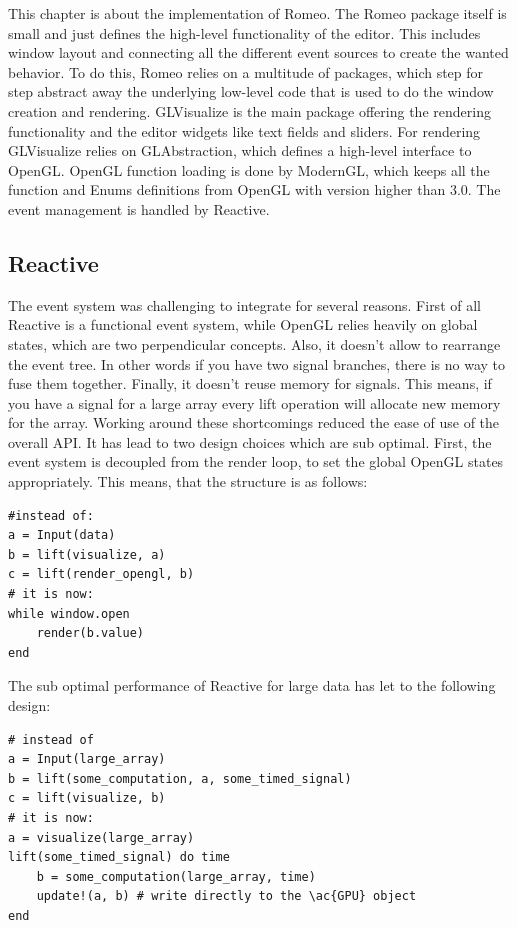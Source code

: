 This chapter is about the implementation of Romeo.
The Romeo package itself is small and just defines the high-level functionality of the editor.
This includes window layout and connecting all the different event sources to create the wanted behavior.
To do this, Romeo relies on a multitude of packages, which step for step abstract away the underlying low-level code that is used to do the window creation and rendering.
GLVisualize is the main package offering the rendering functionality and the editor widgets like text fields and sliders.
For rendering GLVisualize relies on GLAbstraction, which defines a high-level interface to \ac{OpenGL}.
\ac{OpenGL} function loading is done by ModernGL, which keeps all the function and Enums definitions from \ac{OpenGL} with version higher than 3.0.
The event management is handled by Reactive.

\subsection{Reactive}

The event system was challenging to integrate for several reasons.
First of all Reactive is a functional event system, while \ac{OpenGL} relies heavily on global states, which are two perpendicular concepts.
Also, it doesn't allow to rearrange the event tree. In other words if you have two signal branches, there is no way to fuse them together.
Finally, it doesn't reuse memory for signals. This means, if you have a signal for a large array every lift operation will allocate new memory for the array.
Working around these shortcomings reduced the ease of use of the overall API.
It has lead to two design choices which are sub optimal.
First, the event system is decoupled from the render loop, to set the global \ac{OpenGL} states appropriately.
This means, that the structure is as follows:
\begin{lstlisting}
#instead of:
a = Input(data)
b = lift(visualize, a)
c = lift(render_opengl, b)
# it is now:
while window.open
	render(b.value)
end
\end{lstlisting}
The sub optimal performance of Reactive for large data has let to the following design:
\begin{lstlisting}
# instead of
a = Input(large_array)
b = lift(some_computation, a, some_timed_signal)
c = lift(visualize, b)
# it is now:
a = visualize(large_array)
lift(some_timed_signal) do time
	b = some_computation(large_array, time)
	update!(a, b) # write directly to the \ac{GPU} object
end
\end{lstlisting}

